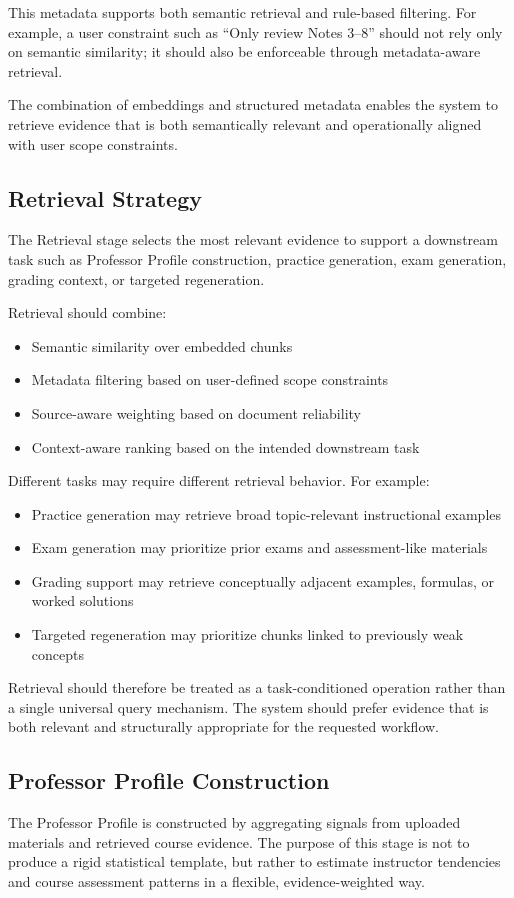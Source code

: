 \documentclass[11pt]{article}
\begin{document}
This metadata supports both semantic retrieval and rule-based filtering. For example, a user constraint such as ``Only review Notes 3--8'' should not rely only on semantic similarity; it should also be enforceable through metadata-aware retrieval.

The combination of embeddings and structured metadata enables the system to retrieve evidence that is both semantically relevant and operationally aligned with user scope constraints.

\subsection{Retrieval Strategy}
The Retrieval stage selects the most relevant evidence to support a downstream task such as Professor Profile construction, practice generation, exam generation, grading context, or targeted regeneration.

Retrieval should combine:
\begin{itemize}
\item Semantic similarity over embedded chunks
\item Metadata filtering based on user-defined scope constraints
\item Source-aware weighting based on document reliability
\item Context-aware ranking based on the intended downstream task
\end{itemize}

Different tasks may require different retrieval behavior. For example:
\begin{itemize}
\item Practice generation may retrieve broad topic-relevant instructional examples
\item Exam generation may prioritize prior exams and assessment-like materials
\item Grading support may retrieve conceptually adjacent examples, formulas, or worked solutions
\item Targeted regeneration may prioritize chunks linked to previously weak concepts
\end{itemize}

Retrieval should therefore be treated as a task-conditioned operation rather than a single universal query mechanism. The system should prefer evidence that is both relevant and structurally appropriate for the requested workflow.

\subsection{Professor Profile Construction}
The Professor Profile is constructed by aggregating signals from uploaded materials and retrieved course evidence. The purpose of this stage is not to produce a rigid statistical template, but rather to estimate instructor tendencies and course assessment patterns in a flexible, evidence-weighted way.
\end{document}

